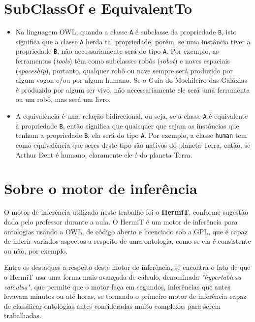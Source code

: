 \documentclass{article}
\begin{document}
    \section*{SubClassOf e EquivalentTo}
        \begin{itemize}
            \item Na linguagem OWL, quando a classe \texttt{A} é subclasse da
                propriedade \texttt{B}, isto significa que a classe \texttt{A}
                herda tal propriedade, porém, se uma instância tiver a
                propriedade \texttt{B}, não necessariamente será do tipo
                \texttt{A}. Por exemplo, as ferramentas (\textit{tools}) têm
                como subclasses robôs (\textit{robot}) e naves espaciais
                (\textit{spaceship}), portanto, qualquer robô ou nave sempre
                será produzido por algum vogon e/ou por algum humano. Se o Guia
                do Mochileiro das Galáxias é produzido por algum ser vivo, não
                necessariamente ele será uma ferramenta ou um robô, mas será um
                livro. 
            
            \item A equivalência é uma relação bidirecional, ou seja, se a
                classe \texttt{A} é equivalente à propriedade \texttt{B}, então
                significa que quaisquer que sejam as instâncias que tenham a
                propriedade \texttt{B}, ela será do tipo \texttt{A}. Por
                exemplo, a classe \texttt{human} tem como equivalência que
                seres deste tipo são nativos do planeta Terra, então, se Arthur
                Dent é humano, claramente ele é do planeta Terra.
        \end{itemize}
    
    \section*{Sobre o motor de inferência}
        O motor de inferência utilizado neste trabalho foi o \textbf{HermiT},
        conforme sugestão dada pelo professor durante a aula. O HermiT é um
        motor de inferência para ontologias usando a OWL, de código aberto e
        licenciado sob a GPL, que é capaz de inferir variados aspectos a
        respeito de uma ontologia, como se ela é consistente ou não, por
        exemplo.
        
        Entre os destaques a respeito deste motor de inferência, se encontra o
        fato de que o HermiT usa uma forma mais avançada de cálculo, denominada
        \textit{"hypertableau calculus"}, que permite que o motor faça em
        segundos, inferências que antes levavam minutos ou até horas, se
        tornando o primeiro motor de inferência capaz de classificar ontologias
        antes consideradas muito complexas para serem trabalhadas.
        
\end{document}
